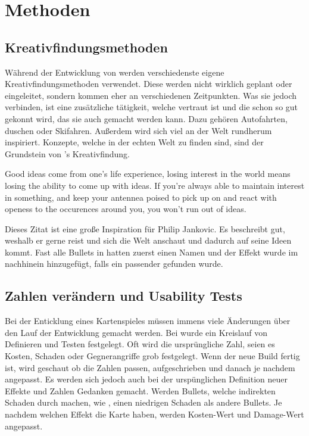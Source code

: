
\section{Methoden}\label{sec:methoden}

\renewcommand{\kapitelautor}{Autor: Philip Jankovic}

%

\subsection{Kreativfindungsmethoden}\label{subsec:kreativfindungsmethoden}

Während der Entwicklung von \FF werden verschiedenste eigene Kreativfindungsmethoden verwendet. Diese werden nicht wirklich
geplant oder eingeleitet, sondern kommen eher an verschiedenen Zeitpunkten. Was sie jedoch verbinden, ist eine zusätzliche
tätigkeit, welche vertraut ist und die schon so gut gekonnt wird, das sie auch  gemacht werden kann.
Dazu gehören \zB Autofahrten, duschen oder Skifahren. Außerdem wird sich viel an der Welt rundherum inspiriert.
Konzepte, welche in der echten Welt zu finden sind, sind der Grundstein von \FF's Kreativfindung.

\begin{coolQuote}
Good ideas come from one's life experience, losing interest in the world means losing the ability to come up with ideas.
If you're always able to maintain interest in something, and keep your antennea poised to pick up on and react with openess
to the occurences around you, you won't run out of ideas.
\end{coolQuote}

Dieses Zitat ist eine große Inspiration für Philip Jankovic. Es beschreibt gut, weshalb er gerne reist und sich die Welt
anschaut und dadurch auf seine Ideen kommt. Fast alle Bullets in \FF hatten zuerst einen Namen und der Effekt wurde
im nachhinein hinzugefügt, falls ein passender gefunden wurde.


\subsection{Zahlen verändern und Usability Tests}\label{subsec:usability}

Bei der Enticklung eines Kartenspieles müssen immens viele Änderungen über den Lauf der Entwicklung gemacht werden.
Bei \FF wurde ein Kreislauf von Definieren und Testen festgelegt. Oft wird die ursprüngliche Zahl, seien es Kosten,
Schaden oder Gegnerangriffe grob festgelegt. Wenn der neue Build fertig ist, wird geschaut ob die Zahlen passen, aufgeschrieben und danach
je nachdem angepasst. Es werden sich jedoch auch bei der urspünglichen Definition neuer Effekte und Zahlen Gedanken gemacht.
\zB Werden Bullets, welche indirekten Schaden durch \zB {} machen, wie , einen niedrigen Schaden als andere Bullets.
Je nachdem welchen Effekt die Karte haben, werden Kosten-Wert und Damage-Wert angepasst.




%

\renewcommand{\kapitelautor}{}
